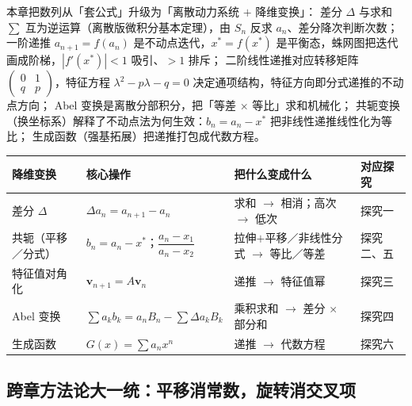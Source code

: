 \begin{explore}
\begin{summary}
本章把数列从「套公式」升级为「离散动力系统 $+$ 降维变换」：
差分 $\Delta$ 与求和 $\sum$ 互为逆运算（离散版微积分基本定理），由 $S_n$ 反求 $a_n$、差分降次判断次数；
一阶递推 $a_{n+1}=f(a_n)$ 是不动点迭代，$x^*=f(x^*)$ 是平衡态，蛛网图把迭代画成阶梯，$|f'(x^*)|<1$ 吸引、$>1$ 排斥；
二阶线性递推对应转移矩阵 $\begin{pmatrix}0&1\\q&p\end{pmatrix}$，特征方程 $\lambda^2-p\lambda-q=0$ 决定通项结构，特征方向即分式递推的不动点方向；
Abel 变换是离散分部积分，把「等差 $\times$ 等比」求和机械化；
共轭变换（换坐标系）解释了不动点法为何生效：$b_n=a_n-x^*$ 把非线性递推线性化为等比；
生成函数（强基拓展）把递推打包成代数方程。

\begin{center}
\footnotesize
\setlength{\tabcolsep}{4pt}
\renewcommand{\arraystretch}{1.35}
\begin{tabular}{p{2.1cm}p{4.9cm}p{4.2cm}p{1.9cm}}
\toprule
降维变换 & 核心操作 & 把什么变成什么 & 对应探究 \\
\midrule
差分 $\Delta$ & $\Delta a_n=a_{n+1}-a_n$ & 求和 $\to$ 相消；高次 $\to$ 低次 & 探究一 \\
共轭（平移／分式） & $b_n=a_n-x^*$；$\dfrac{a_n-x_1}{a_n-x_2}$ & 拉伸$+$平移／非线性分式 $\to$ 等比／等差 & 探究二、五 \\
特征值对角化 & $\mathbf v_{n+1}=A\mathbf v_n$ & 递推 $\to$ 特征值幂 & 探究三 \\
Abel 变换 & $\sum a_kb_k=a_nB_n-\sum\Delta a_kB_k$ & 乘积求和 $\to$ 差分 $\times$ 部分和 & 探究四 \\
生成函数 & $G(x)=\sum a_nx^n$ & 递推 $\to$ 代数方程 & 探究六 \\
\bottomrule
\end{tabular}
\end{center}

\end{summary}

\end{explore}

\subsection{跨章方法论大一统：平移消常数，旋转消交叉项}

